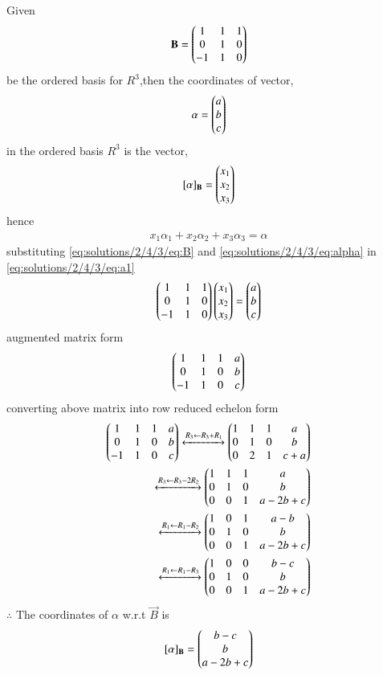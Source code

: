 Given
\begin{align}
\mathbf{B} = \begin{pmatrix}1&1&1\\0&1&0\\-1&1&0\end{pmatrix}\label{eq:solutions/2/4/3/eq:B}
\end{align}
be the ordered basis for $R^3$,then the coordinates of vector,
\begin{align}
\mathbf{\alpha} = \begin{pmatrix}a\\b\\c\end{pmatrix}\label{eq:solutions/2/4/3/eq:alpha}
\end{align}
in the ordered basis $R^3$ is the vector,
\begin{align}
\mathbf{[\alpha]_B} = \begin{pmatrix}x_1\\x_2\\x_3\end{pmatrix}\label{eq:solutions/2/4/3/eq:x}
\end{align}
hence
\begin{align}
x_1\alpha_1+x_2\alpha_2+x_3\alpha_3 = \alpha\label{eq:solutions/2/4/3/eq:a1}
\end{align}
substituting \eqref{eq:solutions/2/4/3/eq:B} and \eqref{eq:solutions/2/4/3/eq:alpha} in \eqref{eq:solutions/2/4/3/eq:a1}
\begin{align}
\begin{pmatrix}1&1&1\\0&1&0\\-1&1&0\end{pmatrix}\begin{pmatrix}x_1\\x_2\\x_3\end{pmatrix} = \begin{pmatrix}a\\b\\c\end{pmatrix}
\end{align}
augmented matrix form
\begin{align}
\begin{pmatrix}1&1&1&a\\0&1&0&b\\-1&1&0&c\end{pmatrix}
\end{align}
converting above matrix into row reduced echelon form
\begin{align}
\begin{pmatrix}1&1&1&a\\0&1&0&b\\-1&1&0&c\end{pmatrix}\xleftrightarrow[]{R_3\leftarrow R_3+R_1}\begin{pmatrix}1&1&1&a\\0&1&0&b\\0&2&1&c+a\end{pmatrix}\\
\xleftrightarrow[]{R_3\leftarrow R_3-2R_2}\begin{pmatrix}1&1&1&a\\0&1&0&b\\0&0&1&a-2b+c\end{pmatrix}\\
\xleftrightarrow[]{R_1\leftarrow R_1-R_2}\begin{pmatrix}1&0&1&a-b\\0&1&0&b\\0&0&1&a-2b+c\end{pmatrix}\\
\xleftrightarrow[]{R_1\leftarrow R_1-R_3}\begin{pmatrix}1&0&0&b-c\\0&1&0&b\\0&0&1&a-2b+c\end{pmatrix}
\end{align}
$\therefore$ The coordinates of $\alpha$ w.r.t $\vec{B}$ is
\begin{align}
\mathbf{[\alpha]_B} = \begin{pmatrix}b-c\\b\\a-2b+c\end{pmatrix}
\end{align}

